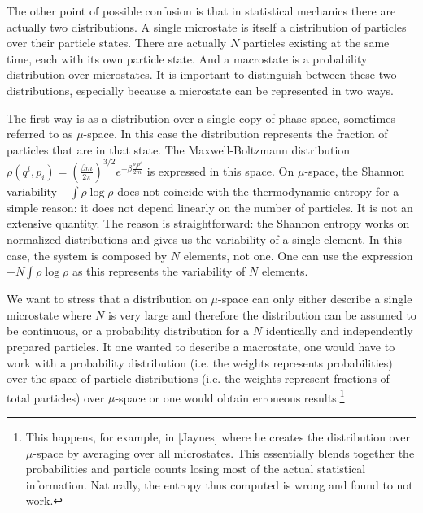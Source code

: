 \documentclass{article}
\begin{document}
The other point of possible confusion is that in statistical mechanics there are actually two distributions. A single microstate is itself a distribution of particles over their particle states. There are actually $N$ particles existing at the same time, each with its own particle state. And a macrostate is a probability distribution over microstates. It is important to distinguish between these two distributions, especially because a microstate can be represented in two ways.

The first way is as a distribution over a single copy of phase space, sometimes referred to as $\mu$-space. In this case the distribution represents the fraction of particles that are in that state. The Maxwell-Boltzmann distribution $\rho(q^i, p_i) = \left(\frac{\beta m}{2\pi} \right)^{3/2}e^{-\beta \frac{p_ip^i}{2m}}$ is expressed in this space. On $\mu$-space, the Shannon variability $-\int\rho \log \rho$ does not coincide with the thermodynamic entropy for a simple reason: it does not depend linearly on the number of particles. It is not an extensive quantity. The reason is straightforward: the Shannon entropy works on normalized distributions and gives us the variability of a single element. In this case, the system is composed by $N$ elements, not one. One can use the expression $-N\int\rho \log \rho$ as this represents the variability of $N$ elements.

We want to stress that a distribution on $\mu$-space can only either describe a single microstate where $N$ is very large and therefore the distribution can be assumed to be continuous, or a probability distribution for a $N$ identically and independently prepared particles. It one wanted to describe a macrostate, one would have to work with a probability distribution (i.e. the weights represents probabilities) over the space of particle distributions (i.e. the weights represent fractions of total particles) over $\mu$-space or one would obtain erroneous results.\footnote{This happens, for example, in [Jaynes] where he creates the distribution over $\mu$-space by averaging over all microstates. This essentially blends together the probabilities and particle counts losing most of the actual statistical information. Naturally, the entropy thus computed is wrong and found to not work.}
\end{document}

